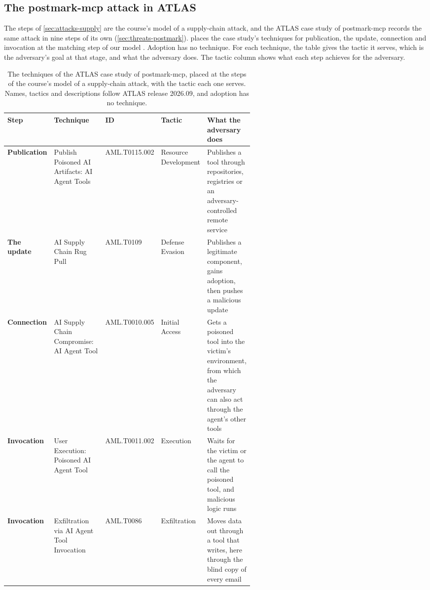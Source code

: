 \subsection{The postmark-mcp attack in ATLAS}
\label{sec:attacks-postmark}

The steps of \cref{sec:attacks-supply} are the course's model of a supply-chain attack, and the
ATLAS case study of postmark-mcp records the same attack in nine steps of its own
(\cref{sec:threats-postmark}).  places the case study's techniques for
publication, the update, connection and invocation at the matching step of our model
\citep{atlas-cs0053-postmark}. Adoption has no technique. For each technique, the table gives the
tactic it serves, which is the adversary's goal at that stage, and what the adversary does. The
tactic column shows what each step achieves for the adversary.

\begin{table}[tb]
  \caption{The techniques of the ATLAS case study of postmark-mcp, placed at the steps of the
  course's model of a supply-chain attack, with the tactic each one serves. Names, tactics and
  descriptions follow ATLAS release 2026.09, and adoption has no technique.}
  \label{tab:attacks-postmark}
  \begin{adjustbox}{width=\linewidth}\begin{tabularx}{\linewidth}{L{0.1\linewidth}L{0.23\linewidth}L{0.125\linewidth}L{0.13\linewidth}X}
    \toprule
    \textbf{Step} & \textbf{Technique} & \textbf{ID} & \textbf{Tactic} & \textbf{What the adversary does} \\
    \midrule
    \textbf{Publication} & Publish Poisoned AI Artifacts: AI Agent Tools & AML.T0115.002 & Resource
    Development & Publishes a tool through repositories, registries or an adversary-controlled
    remote service \\
    \textbf{The update} & AI Supply Chain Rug Pull & AML.T0109 & Defense Evasion & Publishes a
    legitimate component, gains adoption, then pushes a malicious update \\
    \textbf{Connection} & AI Supply Chain Compromise: AI Agent Tool & AML.T0010.005 & Initial Access
    & Gets a poisoned tool into the victim's environment, from which the adversary can also act
    through the agent's other tools \\
    \textbf{Invocation} & User Execution: Poisoned AI Agent Tool & AML.T0011.002 & Execution & Waits
    for the victim or the agent to call the poisoned tool, and malicious logic runs \\
    \textbf{Invocation} & Exfiltration via AI Agent Tool Invocation & AML.T0086 & Exfiltration &
    Moves data out through a tool that writes, here through the blind copy of every email \\
    \bottomrule
  \end{tabularx}\end{adjustbox}
\end{table}

